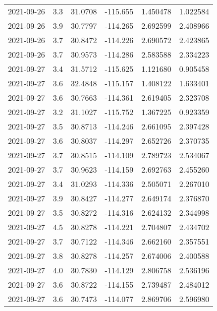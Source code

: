 \begin{tabular}{lrrrrr}
2021-09-26 &       3.3 &  31.0708 &  -115.655 &         1.450478 &         1.022584 \\
2021-09-26 &       3.9 &  30.7797 &  -114.265 &         2.692599 &         2.408966 \\
2021-09-26 &       3.7 &  30.8472 &  -114.226 &         2.690572 &         2.423865 \\
2021-09-26 &       3.7 &  30.9573 &  -114.286 &         2.583588 &         2.334223 \\
2021-09-27 &       3.4 &  31.5712 &  -115.625 &         1.121680 &         0.905458 \\
2021-09-27 &       3.6 &  32.4848 &  -115.157 &         1.408122 &         1.633401 \\
2021-09-27 &       3.6 &  30.7663 &  -114.361 &         2.619405 &         2.323708 \\
2021-09-27 &       3.2 &  31.1027 &  -115.752 &         1.367225 &         0.923359 \\
2021-09-27 &       3.5 &  30.8713 &  -114.246 &         2.661095 &         2.397428 \\
2021-09-27 &       3.6 &  30.8037 &  -114.297 &         2.652726 &         2.370735 \\
2021-09-27 &       3.7 &  30.8515 &  -114.109 &         2.789723 &         2.534067 \\
2021-09-27 &       3.7 &  30.9623 &  -114.159 &         2.692763 &         2.455260 \\
2021-09-27 &       3.4 &  31.0293 &  -114.336 &         2.505071 &         2.267010 \\
2021-09-27 &       3.9 &  30.8427 &  -114.277 &         2.649174 &         2.376870 \\
2021-09-27 &       3.5 &  30.8272 &  -114.316 &         2.624132 &         2.344998 \\
2021-09-27 &       4.5 &  30.8278 &  -114.221 &         2.704807 &         2.434702 \\
2021-09-27 &       3.7 &  30.7122 &  -114.346 &         2.662160 &         2.357551 \\
2021-09-27 &       3.8 &  30.8278 &  -114.257 &         2.674006 &         2.400588 \\
2021-09-27 &       4.0 &  30.7830 &  -114.129 &         2.806758 &         2.536196 \\
2021-09-27 &       3.6 &  30.8722 &  -114.155 &         2.739487 &         2.484012 \\
2021-09-27 &       3.6 &  30.7473 &  -114.077 &         2.869706 &         2.596980 \\

\end{tabular}
